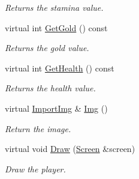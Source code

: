 \begin{DoxyCompactItemize}
\begin{DoxyCompactList}\small\item\em Returns the stamina value. \end{DoxyCompactList}\item 
virtual int \hyperlink{classCharacter_a85ce5d70120b39b72363ce9901e3ce70}{Get\-Gold} () const 
\begin{DoxyCompactList}\small\item\em Returns the gold value. \end{DoxyCompactList}\item 
virtual int \hyperlink{classCharacter_a0e4d78d1bdebed299d4caa36f2d70209}{Get\-Health} () const 
\begin{DoxyCompactList}\small\item\em Returns the health value. \end{DoxyCompactList}\item 
virtual \hyperlink{classImportImg}{Import\-Img} \& \hyperlink{classCharacter_a49cd0fdb0fc9e0f824aa54909ca86b2b}{Img} ()
\begin{DoxyCompactList}\small\item\em Return the image. \end{DoxyCompactList}\item 
virtual void \hyperlink{classCharacter_a2194329f9956a07b9e3dc021da93358e}{Draw} (\hyperlink{classScreen}{Screen} \&screen)
\begin{DoxyCompactList}\small\item\em Draw the player. \end{DoxyCompactList}\end{DoxyCompactItemize}
